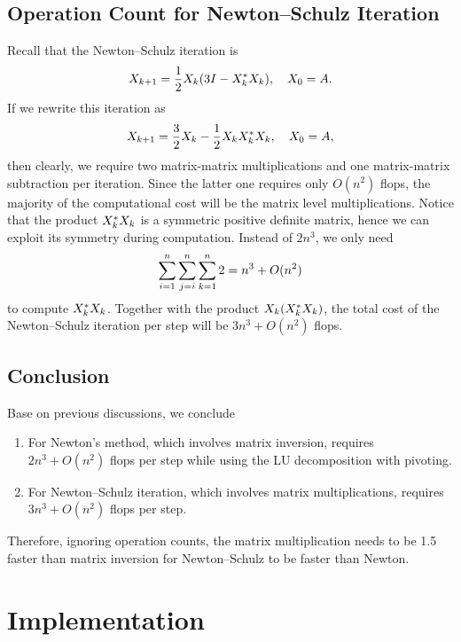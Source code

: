 \documentclass[12pt]{article}
\begin{document}
\subsection{Operation Count for Newton--Schulz Iteration}
Recall that the Newton--Schulz iteration is 
\begin{equation}\notag
    X_{k+1} = \frac 12 X_k(3I-X_k^* X_k),\quad X_0 = A.
\end{equation}
If we rewrite this iteration as
\begin{equation}
    \notag
    X_{k+1} = \frac{3}{2} X_k - \frac{1}{2}X_kX_k^* X_k,\quad X_0 = A,
\end{equation}
then clearly, we require two matrix-matrix multiplications and one matrix-matrix subtraction per iteration. Since the latter one requires only $O(n^2)$ flops, the majority of the computational cost will be the matrix level multiplications. Notice that the product $X_k^* X_k$ is a symmetric positive definite matrix, hence we can exploit its symmetry during computation. Instead of $2n^3$, we only need 
\begin{equation}
    \notag 
    \sum_{i=1}^n\sum_{j=i}^n\sum_{k=1}^n 2 = n^3 + O(n^2)
\end{equation}
to compute $X_k^* X_k$. Together with the product $X_k(X_k^* X_k)$, the total cost of the Newton--Schulz iteration per step will be $3n^3 + O(n^2)$ flops.

\subsection{Conclusion}
Base on previous discussions, we conclude 
\begin{enumerate}
    \item For Newton's method, which involves matrix inversion, requires $2n^3 + O(n^2)$ flops per step while using the LU decomposition with pivoting.
    \item For Newton--Schulz iteration, which involves matrix multiplications, requires $3n^3 + O(n^2)$ flops per step.
\end{enumerate}

Therefore, ignoring operation counts, the matrix multiplication needs to be 1.5 faster than matrix inversion for Newton--Schulz to be faster than Newton.

\section{Implementation}
\end{document}
